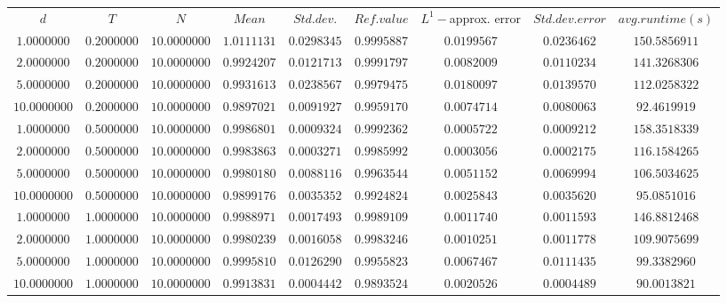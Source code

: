 \begin{tabular}{ccccccccc}
$d$ & $T$ & $N$ & $Mean$ & $Std. dev.$ & $Ref. value$ & $L^1-$approx. error & $Std. dev. error$ & $avg. runtime (s)$\\
$1.0000000$ & $0.2000000$ & $10.0000000$ & $1.0111131$ & $0.0298345$ & $0.9995887$ & $0.0199567$ & $0.0236462$ & $150.5856911$\\
$2.0000000$ & $0.2000000$ & $10.0000000$ & $0.9924207$ & $0.0121713$ & $0.9991797$ & $0.0082009$ & $0.0110234$ & $141.3268306$\\
$5.0000000$ & $0.2000000$ & $10.0000000$ & $0.9931613$ & $0.0238567$ & $0.9979475$ & $0.0180097$ & $0.0139570$ & $112.0258322$\\
$10.0000000$ & $0.2000000$ & $10.0000000$ & $0.9897021$ & $0.0091927$ & $0.9959170$ & $0.0074714$ & $0.0080063$ & $92.4619919$\\
$1.0000000$ & $0.5000000$ & $10.0000000$ & $0.9986801$ & $0.0009324$ & $0.9992362$ & $0.0005722$ & $0.0009212$ & $158.3518339$\\
$2.0000000$ & $0.5000000$ & $10.0000000$ & $0.9983863$ & $0.0003271$ & $0.9985992$ & $0.0003056$ & $0.0002175$ & $116.1584265$\\
$5.0000000$ & $0.5000000$ & $10.0000000$ & $0.9980180$ & $0.0088116$ & $0.9963544$ & $0.0051152$ & $0.0069994$ & $106.5034625$\\
$10.0000000$ & $0.5000000$ & $10.0000000$ & $0.9899176$ & $0.0035352$ & $0.9924824$ & $0.0025843$ & $0.0035620$ & $95.0851016$\\
$1.0000000$ & $1.0000000$ & $10.0000000$ & $0.9988971$ & $0.0017493$ & $0.9989109$ & $0.0011740$ & $0.0011593$ & $146.8812468$\\
$2.0000000$ & $1.0000000$ & $10.0000000$ & $0.9980239$ & $0.0016058$ & $0.9983246$ & $0.0010251$ & $0.0011778$ & $109.9075699$\\
$5.0000000$ & $1.0000000$ & $10.0000000$ & $0.9995810$ & $0.0126290$ & $0.9955823$ & $0.0067467$ & $0.0111435$ & $99.3382960$\\
$10.0000000$ & $1.0000000$ & $10.0000000$ & $0.9913831$ & $0.0004442$ & $0.9893524$ & $0.0020526$ & $0.0004489$ & $90.0013821$\\
\end{tabular}
